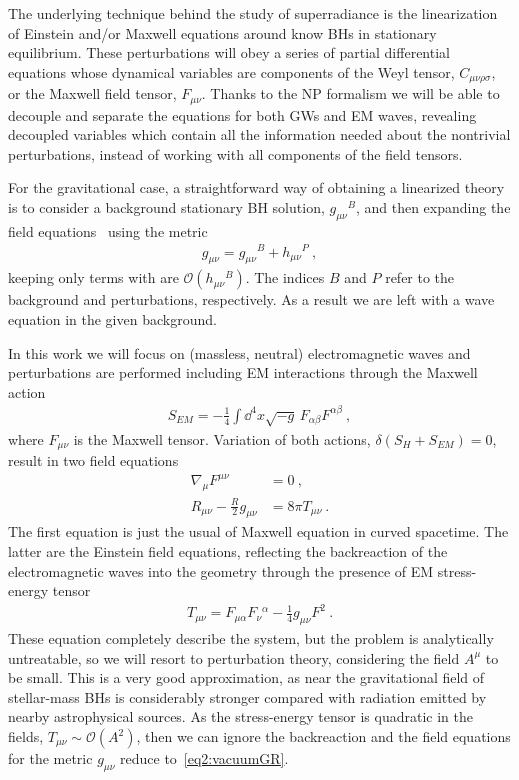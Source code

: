 The underlying technique behind the study of superradiance is the linearization of Einstein and/or Maxwell equations around know BHs in stationary equilibrium.
These perturbations will obey a series of partial differential equations whose dynamical variables are components of the Weyl tensor, $C_{\mu\nu\rho\sigma}$, or the Maxwell field tensor, $F_{\mu\nu}$.
Thanks to the NP formalism we will be able to decouple and separate the equations for both GWs and EM waves, revealing decoupled variables which contain all the information needed about the nontrivial perturbations, instead of working with all components of the field tensors.

For the gravitational case, a straightforward way of obtaining a linearized theory is to consider a background stationary BH solution, $g_{\mu\nu}{}^B$, and then expanding the field equations~ using the metric 
\begin{align}
    g_{\mu\nu} = g_{\mu\nu}{}^B + h_{\mu\nu}{}^P ~,
    \label{eq2:metricBP}
\end{align}
keeping only terms with are $\mathscr{O}(h_{\mu\nu}{}^B)$. The indices $B$ and $P$ refer to the background and perturbations, respectively.
As a result we are left with a wave equation in the given background. 

In this work we will focus on (massless, neutral) electromagnetic waves and perturbations are performed including EM interactions through the Maxwell action
\begin{align}
    S_{EM} = - \frac{1}{4} \int \dd^4 x \sqrt{-g} \,F_{\alpha\beta} F^{\alpha\beta} ~,
     \label{eq2:actionEM}
\end{align}
where $F_{\mu\nu}$ is the Maxwell tensor.
Variation of both actions, $\delta(S_H + S_{EM}) = 0$, result in two field equations
\begin{align}
    \nabla_\mu F^{\mu\nu} &= 0 ~, \label{eq2:maxwellEM} \\
    R_{\mu\nu} - \frac{R}{2} g_{\mu\nu} &= 8 \pi T_{\mu\nu} \label{eq2:EM+GR}  ~.
\end{align}
The first equation is just the usual of Maxwell equation in curved spacetime.
The latter are the Einstein field equations, reflecting the backreaction of the electromagnetic waves into the geometry through the presence of EM stress-energy tensor
\begin{align}
    T_{\mu\nu} = F_{\mu\alpha} F_{\nu}{}^{\alpha} - \frac{1}{4} g_{\mu\nu} F^2  ~.
    \label{eq2:stressenergyEM}
\end{align}
These equation completely describe the system, but the problem is analytically untreatable, so we will resort to perturbation theory, considering the field $A^\mu$ to be small. 
This is a very good approximation, as near the gravitational field of stellar-mass BHs is considerably stronger compared with radiation emitted by nearby astrophysical sources.
As the stress-energy tensor is quadratic in the fields, $T_{\mu\nu}\sim\mathscr{O}(A^2)$, then we can ignore the backreaction and the field equations for the metric $g_{\mu\nu}$ reduce to~\eqref{eq2:vacuumGR}.


